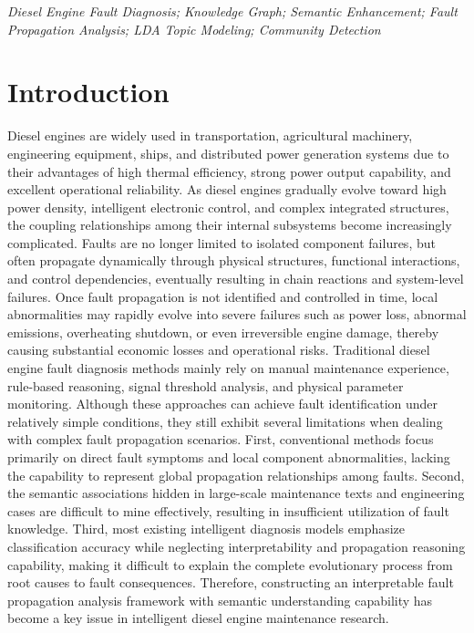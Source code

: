 \documentclass[conference]{IEEEconf}
\begin{document}
\IEEEoverridecommandlockouts
\vspace{1.5ex}
\begin{keywords}
\itshape Diesel Engine Fault Diagnosis; Knowledge Graph; Semantic Enhancement; Fault Propagation Analysis; LDA Topic Modeling; Community Detection
\end{keywords}
%
\IEEEpeerreviewmaketitle
\section{Introduction}
Diesel engines are widely used in transportation, agricultural machinery, engineering equipment, ships, and distributed power generation systems due to their advantages of high thermal efficiency, strong power output capability, and excellent operational reliability\cite{mollenhauer2010handbook}. As diesel engines gradually evolve toward high power density, intelligent electronic control, and complex integrated structures, the coupling relationships among their internal subsystems become increasingly complicated. Faults are no longer limited to isolated component failures, but often propagate dynamically through physical structures, functional interactions, and control dependencies, eventually resulting in chain reactions and system-level failures\cite{gao2008fault}. Once fault propagation is not identified and controlled in time, local abnormalities may rapidly evolve into severe failures such as power loss, abnormal emissions, overheating shutdown, or even irreversible engine damage, thereby causing substantial economic losses and operational risks.
Traditional diesel engine fault diagnosis methods mainly rely on manual maintenance experience, rule-based reasoning, signal threshold analysis, and physical parameter monitoring\cite{peng2012application}. Although these approaches can achieve fault identification under relatively simple conditions, they still exhibit several limitations when dealing with complex fault propagation scenarios\cite{zheng2020fault}. First, conventional methods focus primarily on direct fault symptoms and local component abnormalities, lacking the capability to represent global propagation relationships among faults. Second, the semantic associations hidden in large-scale maintenance texts and engineering cases are difficult to mine effectively, resulting in insufficient utilization of fault knowledge\cite{naryanto2023diesel}. Third, most existing intelligent diagnosis models emphasize classification accuracy while neglecting interpretability and propagation reasoning capability, making it difficult to explain the complete evolutionary process from root causes to fault consequences. Therefore, constructing an interpretable fault propagation analysis framework with semantic understanding capability has become a key issue in intelligent diesel engine maintenance research.
\end{document}
